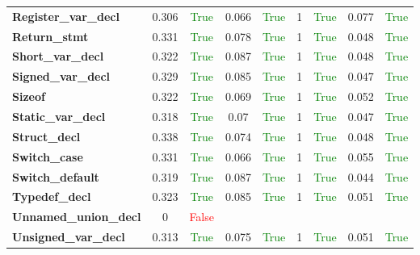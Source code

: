 \documentclass{article}
\begin{document}
\begin{xltabular}{\textwidth}{lcccccccc}
\textbf{{\fontsize{10}{12}\selectfont Register\_var\_decl}}& 0.306&\textcolor{green}{True}& 0.066&\textcolor{green}{True}& 1&\textcolor{green}{True}& 0.077&\textcolor{green}{True} \\[0.5ex]
\textbf{{\fontsize{10}{12}\selectfont Return\_stmt}}& 0.331&\textcolor{green}{True}& 0.078&\textcolor{green}{True}& 1&\textcolor{green}{True}& 0.048&\textcolor{green}{True} \\[0.5ex]
\textbf{{\fontsize{10}{12}\selectfont Short\_var\_decl}}& 0.322&\textcolor{green}{True}& 0.087&\textcolor{green}{True}& 1&\textcolor{green}{True}& 0.048&\textcolor{green}{True} \\[0.5ex]
\textbf{{\fontsize{10}{12}\selectfont Signed\_var\_decl}}& 0.329&\textcolor{green}{True}& 0.085&\textcolor{green}{True}& 1&\textcolor{green}{True}& 0.047&\textcolor{green}{True} \\[0.5ex]
\textbf{{\fontsize{10}{12}\selectfont Sizeof}}& 0.322&\textcolor{green}{True}& 0.069&\textcolor{green}{True}& 1&\textcolor{green}{True}& 0.052&\textcolor{green}{True} \\[0.5ex]
\textbf{{\fontsize{10}{12}\selectfont Static\_var\_decl}}& 0.318&\textcolor{green}{True}& 0.07&\textcolor{green}{True}& 1&\textcolor{green}{True}& 0.047&\textcolor{green}{True} \\[0.5ex]
\textbf{{\fontsize{10}{12}\selectfont Struct\_decl}}& 0.338&\textcolor{green}{True}& 0.074&\textcolor{green}{True}& 1&\textcolor{green}{True}& 0.048&\textcolor{green}{True} \\[0.5ex]
\textbf{{\fontsize{10}{12}\selectfont Switch\_case}}& 0.331&\textcolor{green}{True}& 0.066&\textcolor{green}{True}& 1&\textcolor{green}{True}& 0.055&\textcolor{green}{True} \\[0.5ex]
\textbf{{\fontsize{10}{12}\selectfont Switch\_default}}& 0.319&\textcolor{green}{True}& 0.087&\textcolor{green}{True}& 1&\textcolor{green}{True}& 0.044&\textcolor{green}{True} \\[0.5ex]
\textbf{{\fontsize{10}{12}\selectfont Typedef\_decl}}& 0.323&\textcolor{green}{True}& 0.085&\textcolor{green}{True}& 1&\textcolor{green}{True}& 0.051&\textcolor{green}{True} \\[0.5ex]
\textbf{{\fontsize{10}{12}\selectfont Unnamed\_union\_decl}}& 0&\textcolor{red}{False} \\[0.5ex]
\textbf{{\fontsize{10}{12}\selectfont Unsigned\_var\_decl}}& 0.313&\textcolor{green}{True}& 0.075&\textcolor{green}{True}& 1&\textcolor{green}{True}& 0.051&\textcolor{green}{True} \\[0.5ex]

\end{xltabular}
\end{document}
